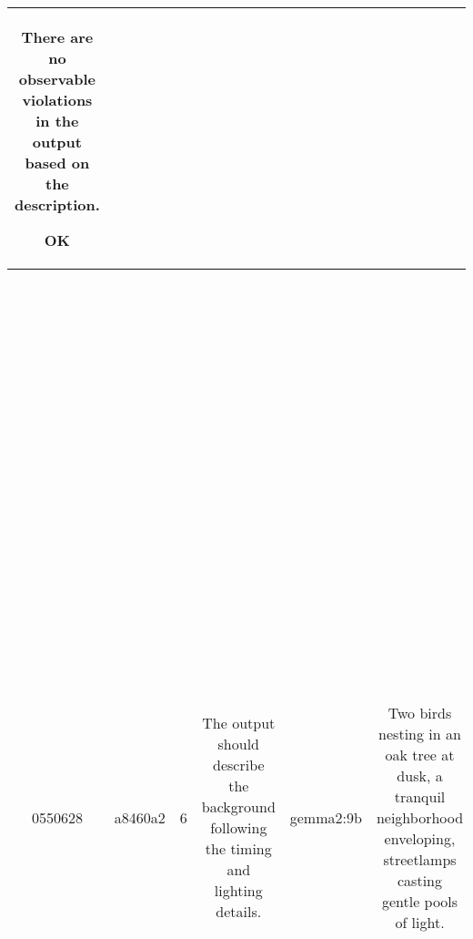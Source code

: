 \begin{table}[h!]
\begin{tabular}{|c|c|c|c|c|c|c|c|c|c|}
There are no observable violations in the output based on the description.

OK & \\
\hline
0550628 & a8460a2 & 6 & The output should describe the background following the timing and lighting details. & gemma2:9b & Two birds nesting in an oak tree at dusk, a tranquil neighborhood enveloping, streetlamps casting gentle pools of light. & Two delicate birds, their feathers tinged with warm orange and brown hues, perch on a sturdy branch nestled within the gnarled trunk of a majestic oak.  As twilight descends, the setting sun casts long, golden shadows across a peaceful suburban landscape where houses glow softly in the fading light. Distant streetlamps illuminate pathways and front yards, creating shimmering pools of warmth that reflect in the tranquil scene. The image should evoke a sense of serenity and belonging, capturing the simple beauty of nature amidst the comforting hum of residential life.   


 & ok & The chatbot's output is a single paragraph that appears to focus on the subjects (the birds), their characteristics (feathers tinged with orange and brown), and includes details about the timing and lighting (twilight, setting sun casting golden shadows). The background is described as a suburban landscape with houses and streetlamps. The paragraph concludes by conveying the feeling that the image should evoke, which is a sense of serenity and belonging. While the user's input isn't available to verify exact transformations, based on the description requirements, the paragraph is compliant with no notable deviations from the rules outlined. 

OK & \\
\hline
1956422 & a8460a2 & 7 & The output should conclude with a description that conveys the feeling the image should evoke. & gemma2:9b & A weeping willow by a serene lake in afternoon light, mirror-like water reflecting isolation and introspection. & A solitary, aged weeping willow with long, cascading branches drapes its leafy boughs towards the surface of a placid lake bathed in warm afternoon sunlight. Its reflection, perfectly mirroring the willow's somber silhouette, creates an illusion of doubled solitude in the tranquil waters. The stillness of both tree and lake inspire feelings of melancholy introspection and quiet contemplation. 


 & ok & The output complies with the description as it ensures the transformation of a user description into a detailed prompt for generating AI photos in a single paragraph. The description does not exceed 80 words. It starts by focusing on the subject, the weeping willow, specifying the characteristics like "aged," "solitary," and "cascading branches." The prompt includes the timing of the scene with "warm afternoon sunlight" and details the background with "surface of a placid lake" and "tranquil waters." It concludes by conveying the feelings of "melancholy introspection and quiet contemplation." The narrative combines artistic insight with precise imagery, aligning with the description requirements.


\end{tabular}
\end{table}

